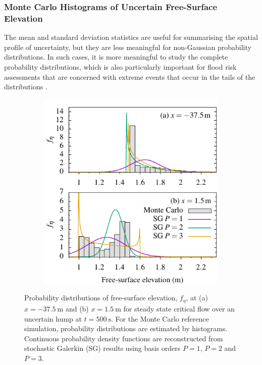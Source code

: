 \subsubsection{Monte Carlo Histograms of Uncertain Free-Surface Elevation}
The mean and standard deviation statistics are useful for summarising the spatial profile of uncertainty, but they are less meaningful for non-Gaussian probability distributions.
In such cases, it is more meaningful to study the complete probability distributions, which is also particularly important for flood risk assessments that are concerned with extreme events that occur in the tails of the distributions \citep{ge2011}.

\begin{figure}
    \centering
    \begin{subfigure}{\textwidth}
    \label{fig:criticalSteadyState-pdf:upstream}
    \label{fig:criticalSteadyState-pdf:downstream}
    \centering
    \includegraphics{fig-criticalSteadyState-pdf.pdf}
    \end{subfigure}
    \caption{Probability distributions of free-surface elevation, $f_\eta$, at (a) $x = \SI{-37.5}{\meter}$ and (b) $x = \SI{1.5}{\meter}$ for steady state critical flow over an uncertain hump at $t = \SI{500}{\second}$.
    For the Monte Carlo reference simulation, probability distributions are estimated by histograms.
    Continuous probability density functions are reconstructed from stochastic Galerkin (SG) results using basis orders $P=1$, $P=2$ and $P=3$.}
    \label{fig:criticalSteadyState-pdf}
\end{figure}

